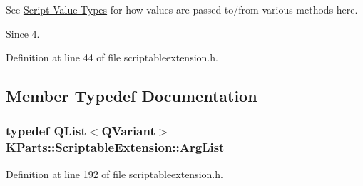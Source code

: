 See \hyperlink{group__ScriptValueTypes}{Script Value Types} for how values are passed to/from various methods here.

\begin{DoxySince}{Since}
4. 
\end{DoxySince}


Definition at line 44 of file scriptableextension.\+h.



\subsection{Member Typedef Documentation}
\hypertarget{classKParts_1_1ScriptableExtension_a6a35540990153f08b6dcf55d4b504c02}{
\subsubsection[{Arg\+List}]{\setlength{\rightskip}{0pt plus 5cm}typedef {\bf Q\+List}$<$Q\+Variant$>$ {\bf K\+Parts\+::\+Scriptable\+Extension\+::\+Arg\+List}}}\label{classKParts_1_1ScriptableExtension_a6a35540990153f08b6dcf55d4b504c02}


Definition at line 192 of file scriptableextension.\+h.



